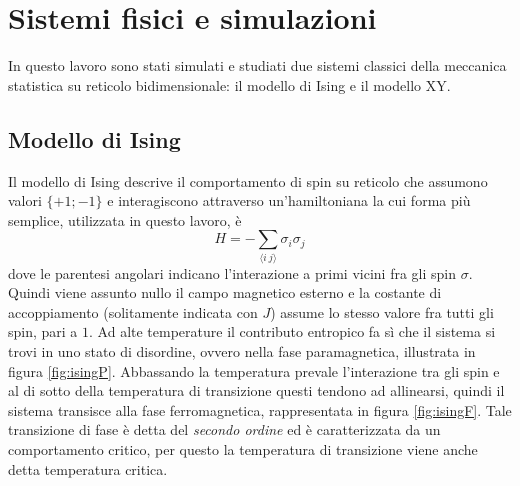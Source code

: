 \documentclass{article}
\begin{document}

\section{Sistemi fisici e simulazioni}
In questo lavoro sono stati simulati e studiati due sistemi classici della meccanica statistica su reticolo bidimensionale:  il modello di Ising e il modello XY.

\subsection{Modello di Ising}\label{sec:simIsing}
Il modello di Ising descrive il comportamento di spin su reticolo che assumono valori $\{+1;-1\}$ e interagiscono attraverso un'hamiltoniana la cui forma più semplice, utilizzata in questo lavoro, è
\begin{equation}
H=- \sum_{\langle i~j\rangle} \sigma_i\sigma_j
\end{equation}
dove le parentesi angolari indicano l'interazione a primi vicini fra gli spin $\sigma$.
Quindi viene assunto nullo il campo magnetico esterno e la costante di accoppiamento (solitamente indicata con $J$) assume lo stesso valore fra tutti gli spin, pari a $1$.
Ad alte temperature il contributo entropico fa sì che il sistema si trovi in uno stato di disordine, ovvero nella fase paramagnetica, illustrata in figura \ref{fig:isingP}.
Abbassando la temperatura prevale l'interazione tra gli spin e al di sotto della temperatura di transizione questi tendono ad allinearsi, quindi il sistema transisce alla fase ferromagnetica, rappresentata in figura \ref{fig:isingF}.
Tale transizione di fase è detta del \emph{secondo ordine} ed è caratterizzata da un comportamento critico, per questo la temperatura di transizione viene anche detta temperatura critica.
\end{document}
